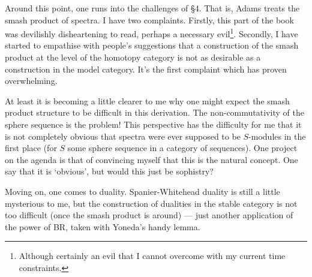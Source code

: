 \documentclass[11pt]{article}
\begin{document}
\begin{AdamsStableHtpy}
Around this point, one runs into the challenges of \S4. That is, Adams treats the smash product of spectra. I have two complaints. Firstly, this part of the book was devilishly disheartening to read, perhaps a necessary evil\footnote{Although certainly an evil that I cannot overcome with my current time constraints.}. Secondly, I have started to empathise with people's suggestions that a construction of the smash product at the level of the homotopy category is not as desirable as a construction in the model category. It's the first complaint which has proven overwhelming.

At least it is becoming a little clearer to me why one might expect the smash product structure to be difficult in this derivation. The non-commutativity of the sphere sequence is the problem! This perspective has the difficulty for me that it is not completely obvious that spectra were ever supposed to be $S$-modules in the first place (for $S$ some sphere sequence in a category of sequences). One project on the agenda is that of convincing myself that this is the natural concept. One say that it is `obvious', but would this just be sophistry?

Moving on, one comes to duality. Spanier-Whitehead duality is still a little mysterious to me, but the construction of dualities in the stable category is not too difficult (once the smash product is around) --- just another application of the power of BR, taken with Yoneda's handy lemma.


\pagebreak
\end{AdamsStableHtpy}
\end{document}
